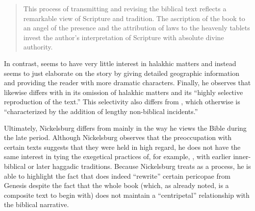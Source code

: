 \begin{quote}
    This process of transmitting and revising the biblical text reflects a remarkable view of Scripture and tradition. The \psgraphic ascription of the book to an angel of the presence and the attribution of laws to the heavenly tablets invest the author's interpretation of Scripture with absolute divine authority.%
    \autocite[101]{nickelsburg_stone1984}
\end{quote} 
\noindent
In contrast, \ga seems to have very little interest in halakhic matters and instead seems to just elaborate on the story by giving detailed geographic information and providing the reader with more dramatic characters.%
    \autocite[106]{nickelsburg_stone1984}
Finally, he observes that \lab likewise differs with \jub in its omission of halakhic matters and its ``highly selective reproduction of the text.''%
    \autocite[110]{nickelsburg_stone1984}
This selectivity also differs from \ga, which otherwise is ``characterized by the addition of lengthy non-biblical incidents.''%
    \autocite[110]{nickelsburg_stone1984} 

Ultimately, Nickelsburg differs from \vermes mainly in the way he views the Bible during the late \secondtemple period. Although Nickelsburg observes that the preoccupation with certain texts suggests that they were held in high regard, he does not have the same interest in tying the exegetical practices of, for example, \jub, with earlier inner-biblical or later haggadic traditions. Because Nickelsburg treats \rwb as a process, he is able to highlight the fact that \firstenoch does indeed ``rewrite'' certain pericopae from Genesis despite the fact that the whole book (which, as already noted, is a composite text to begin with) does not maintain a ``centripetal'' relationship with the biblical narrative. 

